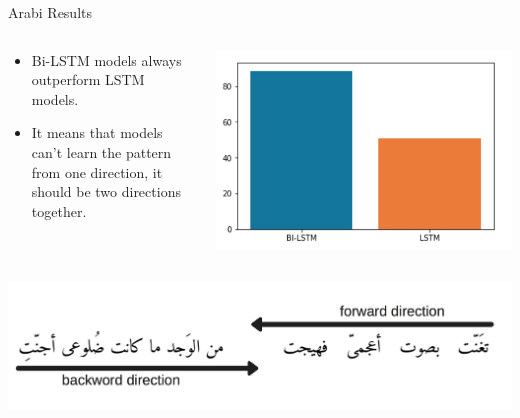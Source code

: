 \documentclass[10pt]{beamer}
\begin{document}
\begin{frame}[fragile]{Arabi Results}



\begin{columns}
\begin{column}{0.7\textwidth}

\begin{itemize}
    \item Bi-LSTM models always outperform LSTM models.\\[1cm]
    \item It means that models can't learn the pattern from one direction, it
should be two directions together.
\end{itemize}

\end{column}
\begin{column}{0.5\textwidth}

\includegraphics[scale=0.1]{fig3.png}

\end{column}
\end{columns}

\begin{center}
    
\includegraphics[scale=0.15]{fig4.png}
\end{center}



\end{frame}
\end{document}
